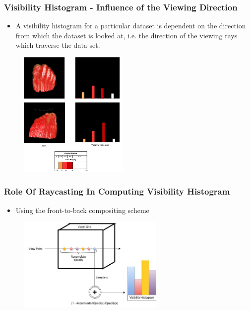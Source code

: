 \documentclass{beamer}
\begin{document}
\begin{frame}
\frametitle{Visibility Histogram - Influence of the Viewing Direction }
\begin{itemize}
\item A visibility histogram for a particular dataset is dependent on the direction from which the dataset is looked at, i.e. the direction of the viewing rays which traverse the data set.
\end{itemize}
\begin{figure}
\centering
\includegraphics[width=150pt]{tf_view_influence.jpg}
\end{figure}
\end{frame}



\begin{frame}
\frametitle{Role Of Raycasting In Computing Visibility Histogram }
\begin{itemize}
\item Using the front-to-back compositing scheme
\end{itemize}
\begin{figure}
\centering
\includegraphics[width=200pt]{VHistogram.jpg}
\end{figure}
\end{frame}

\end{document}
